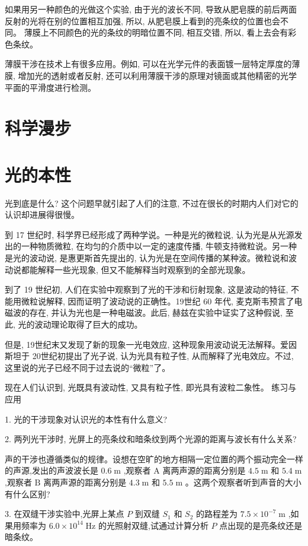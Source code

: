 \documentclass[10pt]{article}
\begin{document}
如果用另一种颜色的光做这个实验, 由于光的波长不同, 导致从肥皂膜的前后两面反射的光将在别的位置相互加强, 所以, 从肥皂膜上看到的亮条纹的位置也会不同。 薄膜上不同颜色的光的条纹的明暗位置不同, 相互交错, 所以, 看上去会有彩色条纹。

薄膜干涉在技术上有很多应用。例如, 可以在光学元件的表面镀一层特定厚度的薄膜, 增加光的透射或者反射, 还可以利用薄膜干涉的原理对镜面或其他精密的光学平面的平滑度进行检测。

\section*{科学漫步}

\section*{光的本性}

光到底是什么? 这个问题早就引起了人们的注意, 不过在很长的时期内人们对它的认识却进展得很慢。

到 17 世纪时, 科学界已经形成了两种学说。一种是光的微粒说, 认为光是从光源发出的一种物质微粒, 在均匀的介质中以一定的速度传播, 牛顿支持微粒说。另一种是光的波动说, 是惠更斯首先提出的, 认为光是在空间传播的某种波。微粒说和波动说都能解释一些光现象, 但又不能解释当时观察到的全部光现象。

到了 19 世纪初, 人们在实验中观察到了光的干涉和衍射现象, 这是波动的特征, 不能用微粒说解释, 因而证明了波动说的正确性。19世纪 60 年代, 麦克斯韦预言了电磁波的存在, 并认为光也是一种电磁波。此后, 赫兹在实验中证实了这种假说, 至此, 光的波动理论取得了巨大的成功。

但是, 19世纪末又发现了新的现象一光电效应, 这种现象用波动说无法解释。爱因斯坦于 20世纪初提出了光子说, 认为光具有粒子性, 从而解释了光电效应。不过, 这里说的光子已经不同于过去说的“微粒”了。

现在人们认识到, 光既具有波动性, 又具有粒子性, 即光具有波粒二象性。 练习与应用

1. 光的干涉现象对认识光的本性有什么意义?

2. 两列光干涉时, 光屏上的亮条纹和暗条纹到两个光源的距离与波长有什么关系?

声的干涉也遵循类似的规律。设想在空旷的地方相隔一定位置的两个振动完全一样的声源,发出的声波波长是 \({0.6}\mathrm{\;m}\) ,观察者 \(\mathrm{A}\) 离两声源的距离分别是 \({4.5}\mathrm{\;m}\) 和 \({5.4}\mathrm{\;m}\) ,观察者 \(\mathrm{B}\) 离两声源的距离分别是 \({4.3}\mathrm{\;m}\) 和 \({5.5}\mathrm{\;m}\) 。这两个观察者听到声音的大小有什么区别?

3. 在双缝干涉实验中,光屏上某点 \(P\) 到双缝 \({S}_{1}\) 和 \({S}_{2}\) 的路程差为 \({7.5} \times {10}^{-7}\mathrm{\;m}\) ,如果用频率为 \({6.0} \times {10}^{14}\mathrm{\;{Hz}}\) 的光照射双缝,试通过计算分析 \(P\) 点出现的是亮条纹还是暗条纹。
\end{document}
